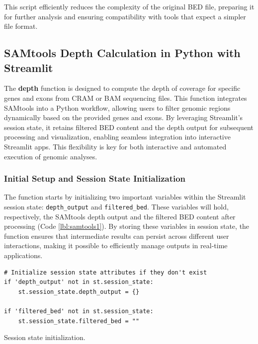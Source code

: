 This script efficiently reduces the complexity of the original BED file, preparing it for further analysis and ensuring compatibility with tools that expect a simpler file format.


\subsection{SAMtools Depth Calculation in Python with Streamlit}

The \textbf{depth} function is designed to compute the depth of coverage for specific genes and exons from CRAM or BAM sequencing files. This function integrates SAMtools into a Python workflow, allowing users to filter genomic regions dynamically based on the provided genes and exons. By leveraging Streamlit's session state, it retains filtered BED content and the depth output for subsequent processing and visualization, enabling seamless integration into interactive Streamlit apps. This flexibility is key for both interactive and automated execution of genomic analyses. 

\subsubsection{\textbf{Initial Setup and Session State Initialization}}

The function starts by initializing two important variables within the Streamlit session state: \texttt{depth\_output} and \texttt{filtered\_bed}. These variables will hold, respectively, the SAMtools depth output and the filtered BED content after processing (Code \ref{lbl:samtools1}). By storing these variables in session state, the function ensures that intermediate results can persist across different user interactions, making it possible to efficiently manage outputs in real-time applications.

\begin{longlisting}
\begin{verbatim}
# Initialize session state attributes if they don't exist
if 'depth_output' not in st.session_state:
    st.session_state.depth_output = {}
    
if 'filtered_bed' not in st.session_state:
    st.session_state.filtered_bed = ""
\end{verbatim}
\caption{Session state initialization.}
\label{lbl:samtools1}
\end{longlisting}

